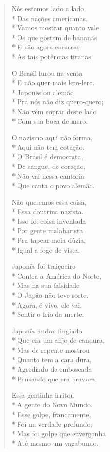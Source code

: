 \begin{verse}
Nós estamos lado a lado\\*
Das nações americanas.\\*
Vamos mostrar quanto vale\\*
Os que gostam de bananas\\*
E vão agora enrascar\\*
As tais potências tiranas.

O Brasil furou na venta\\*
E não quer mais lero-lero.\\*
Japonês ou alemão\\*
Pra nós não diz quero-quero;\\*
Não vêm soprar deste lado\\*
Com sua boca de mero.

O nazismo aqui não forma,\\*
Aqui não tem cotação.\\*
O Brasil é democrata, \\*
De sangue, de coração,\\*
Não vai nessa cantoria\\*
Que canta o povo alemão.

Não queremos essa coisa,\\*
Essa doutrina nazista.\\*
Isso foi coisa inventada\\*
Por gente malabarista\\*
Pra tapear meia dúzia,\\*
Igual a fogo de vista.

Japonês foi traiçoeiro\\*
Contra a América do Norte,\\*
Mas na sua falsidade\\*
O Japão não teve sorte.\\*
Agora, é vivo, ele vai,\\*
Sentir o frio da morte.

Japonês andou fingindo\\*
Que era um anjo de candura,\\*
Mas de repente mostrou\\*
Quanto tem a cara dura,\\*
Agredindo de emboscada\\*
Pensando que era bravura.

Essa gentinha irritou\\*
A gente do Novo Mundo.\\*
Esse golpe, francamente,\\*
Foi na verdade profundo,\\*
Mas foi golpe que envergonha\\*
Até mesmo um vagabundo.


\end{verse}
